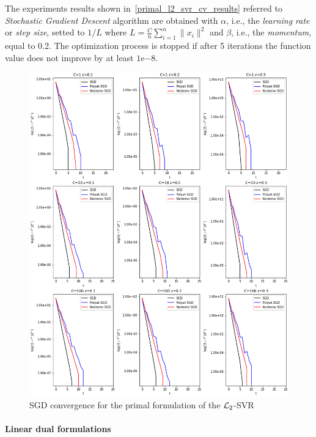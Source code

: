 The experiments results shown in~\ref{primal_l2_svr_cv_results} referred to \emph{Stochastic Gradient Descent} algorithm are obtained with $\alpha$, i.e., the \emph{learning rate} or \emph{step size}, setted to $1/L$ where $\displaystyle L = \frac{C}{n} \sum_{i=1}^n \| x_i \|^2$ and $\beta$, i.e., the \emph{momentum}, equal to 0.2. The optimization process is stopped if after 5 iterations the function value does not improve by at least $1\mathrm{e}{-8}$.



\begin{figure}[H]
	\centering
	\includegraphics[scale=0.5]{img/l2_svr_loss_history}
	\caption{SGD convergence for the primal formulation of the $\protect \mathcal{L}_2$-SVR}
	\label{fig:l2_svr_loss_history}
\end{figure}

\pagebreak

\paragraph{Linear dual formulations}

